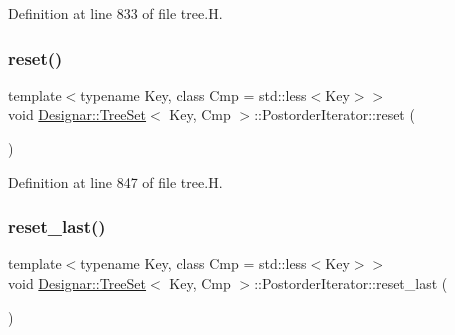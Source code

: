 Definition at line 833 of file tree.\+H.

\mbox{\label{class_designar_1_1_tree_set_1_1_postorder_iterator_a776630cf833ad659523ef4ca99c06553}} 
\subsubsection{\texorpdfstring{reset()}{reset()}}
{\footnotesize\ttfamily template$<$typename Key, class Cmp = std\+::less$<$\+Key$>$$>$ \\
void \hyperlink{class_designar_1_1_tree_set}{Designar\+::\+Tree\+Set}$<$ Key, Cmp $>$\+::Postorder\+Iterator\+::reset (\begin{DoxyParamCaption}{ }\end{DoxyParamCaption})\hspace{0.3cm}{\ttfamily [inline]}}



Definition at line 847 of file tree.\+H.

\mbox{\label{class_designar_1_1_tree_set_1_1_postorder_iterator_a857b3dcc1e25a235f72d0208cdd362a4}} 
\subsubsection{\texorpdfstring{reset\+\_\+last()}{reset\_last()}}
{\footnotesize\ttfamily template$<$typename Key, class Cmp = std\+::less$<$\+Key$>$$>$ \\
void \hyperlink{class_designar_1_1_tree_set}{Designar\+::\+Tree\+Set}$<$ Key, Cmp $>$\+::Postorder\+Iterator\+::reset\+\_\+last (\begin{DoxyParamCaption}{ }\end{DoxyParamCaption})\hspace{0.3cm}{\ttfamily [inline]}}



